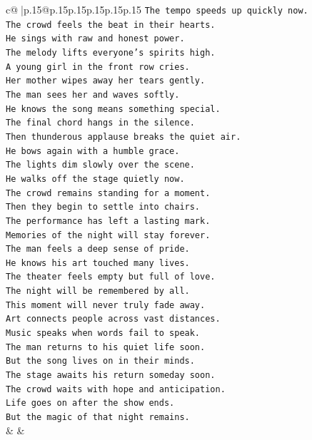 \documentclass{article}
\begin{document}
{\begin{supertabular}{c@{$\;$}|p{.15\linewidth}@{}p{.15\linewidth}p{.15\linewidth}p{.15\linewidth}p{.15\linewidth}p{.15\linewidth}}
{{{\texttt{The tempo speeds up quickly now.} \\
\texttt{The crowd feels the beat in their hearts.} \\
\texttt{He sings with raw and honest power.} \\
\texttt{The melody lifts everyone's spirits high.} \\
\texttt{A young girl in the front row cries.} \\
\texttt{Her mother wipes away her tears gently.} \\
\texttt{The man sees her and waves softly.} \\
\texttt{He knows the song means something special.} \\
\texttt{The final chord hangs in the silence.} \\
\texttt{Then thunderous applause breaks the quiet air.} \\
\texttt{He bows again with a humble grace.} \\
\texttt{The lights dim slowly over the scene.} \\
\texttt{He walks off the stage quietly now.} \\
\texttt{The crowd remains standing for a moment.} \\
\texttt{Then they begin to settle into chairs.} \\
\texttt{The performance has left a lasting mark.} \\
\texttt{Memories of the night will stay forever.} \\
\texttt{The man feels a deep sense of pride.} \\
\texttt{He knows his art touched many lives.} \\
\texttt{The theater feels empty but full of love.} \\
\texttt{The night will be remembered by all.} \\
\texttt{This moment will never truly fade away.} \\
\texttt{Art connects people across vast distances.} \\
\texttt{Music speaks when words fail to speak.} \\
\texttt{The man returns to his quiet life soon.} \\
\texttt{But the song lives on in their minds.} \\
\texttt{The stage awaits his return someday soon.} \\
\texttt{The crowd waits with hope and anticipation.} \\
\texttt{Life goes on after the show ends.} \\
\texttt{But the magic of that night remains.} \\
            }
        }
    }
    & & \\ \\


\end{supertabular}}
\end{document}
